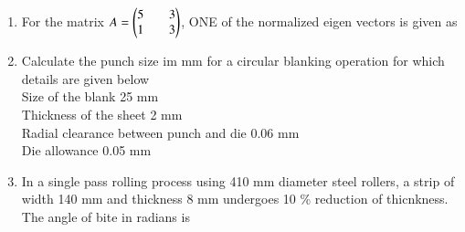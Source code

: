 \documentclass[journal,12pt,onecolumn]{IEEEtran}
\theoremstyle{remark}
\begin{document}
\begin{enumerate}
\begin{enumerate}
		\end{enumerate}
	\item For the matrix $A = \begin{pmatrix}5 && 3 \\ 1 && 3\end{pmatrix}$, ONE of the normalized eigen vectors is given as
		\begin{enumerate}
		\end{enumerate}
	\item Calculate the punch size im mm for a circular blanking operation for which details are given below \\
		Size of the blank 	 25 mm \\
		Thickness of the sheet		2 mm \\
		Radial clearance between punch and die		0.06 mm \\
		Die allowance		0.05 mm
		\begin{enumerate}
				\begin{multicols}{4}
				\item 24.83
				\item 24.89
				\item 25.01
				\item 25.17
				\end{multicols}
		\end{enumerate}
	\item In a single pass rolling process using 410 mm diameter steel rollers, a strip of width 140 mm and thickness 8 mm undergoes 10 \% reduction of thicnkness. The angle of bite in radians is

\end{enumerate}
\end{document}
